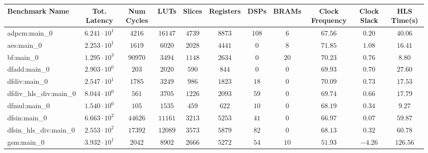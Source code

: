 \begin{tabular}{|l|c|c|c|c|c|c|c|c|c|c|}
\hline
Benchmark Name          & Tot. Latency           & Num Cycles & LUTs      & Slices    & Registers & DSPs    & BRAMs   & Clock Frequency & Clock Slack & HLS Time(s) \\
\hline
adpcm:main\_0           & $ 6.241 \cdot 10^{1} $ & $ 4216   $ & $ 16147 $ & $ 4739  $ & $ 8873  $ & $ 108 $ & $ 6   $ & $ 67.56       $ & $ 0.20    $ & $ 40.06   $ \\
aes:main\_0             & $ 2.253 \cdot 10^{1} $ & $ 1619   $ & $ 6020  $ & $ 2028  $ & $ 4441  $ & $ 0   $ & $ 8   $ & $ 71.85       $ & $ 1.08    $ & $ 16.41   $ \\
bf:main\_0              & $ 1.295 \cdot 10^{3} $ & $ 90970  $ & $ 3494  $ & $ 1148  $ & $ 2634  $ & $ 0   $ & $ 20  $ & $ 70.23       $ & $ 0.76    $ & $ 8.80    $ \\
dfadd:main\_0           & $ 2.903 \cdot 10^{0} $ & $ 203    $ & $ 2020  $ & $ 590   $ & $ 844   $ & $ 0   $ & $ 0   $ & $ 69.93       $ & $ 0.70    $ & $ 27.60   $ \\
dfdiv:main\_0           & $ 2.547 \cdot 10^{1} $ & $ 1785   $ & $ 3249  $ & $ 986   $ & $ 1823  $ & $ 18  $ & $ 0   $ & $ 70.09       $ & $ 0.73    $ & $ 17.53   $ \\
dfdiv\_hls\_div:main\_0 & $ 8.044 \cdot 10^{0} $ & $ 561    $ & $ 3705  $ & $ 1226  $ & $ 2093  $ & $ 59  $ & $ 0   $ & $ 69.74       $ & $ 0.66    $ & $ 17.79   $ \\
dfmul:main\_0           & $ 1.540 \cdot 10^{0} $ & $ 105    $ & $ 1535  $ & $ 459   $ & $ 622   $ & $ 10  $ & $ 0   $ & $ 68.19       $ & $ 0.34    $ & $ 9.27    $ \\
dfsin:main\_0           & $ 6.663 \cdot 10^{2} $ & $ 44626  $ & $ 11161 $ & $ 3213  $ & $ 5253  $ & $ 41  $ & $ 0   $ & $ 66.97       $ & $ 0.07    $ & $ 59.87   $ \\
dfsin\_hls\_div:main\_0 & $ 2.553 \cdot 10^{2} $ & $ 17392  $ & $ 12089 $ & $ 3573  $ & $ 5879  $ & $ 82  $ & $ 0   $ & $ 68.13       $ & $ 0.32    $ & $ 60.78   $ \\
gsm:main\_0             & $ 3.932 \cdot 10^{1} $ & $ 2042   $ & $ 8902  $ & $ 2666  $ & $ 5272  $ & $ 54  $ & $ 10  $ & $ 51.93       $ & $ -4.26   $ & $ 126.56  $ \\

\end{tabular}

